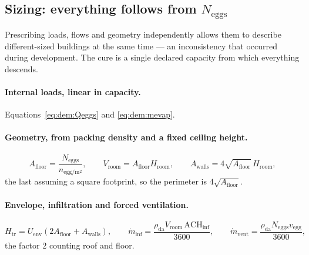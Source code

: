 \documentclass[11pt]{article}
\newcommand{\mdv}{\ensuremath{\dot m_{\mathrm{vent}}}}
\begin{document}
\subsection{Sizing: everything follows from \texorpdfstring{$N_{\mathrm{eggs}}$}{N\_eggs}}
\label{sec:dem:sizing}

Prescribing loads, flows and geometry independently allows them to describe
different-sized buildings at the same time --- an inconsistency that occurred
during development. The cure is a single declared capacity from which everything
descends.

\paragraph{Internal loads, linear in capacity.}
Equations~\eqref{eq:dem:Qeggs} and \eqref{eq:dem:mevap}.

\paragraph{Geometry, from packing density and a fixed ceiling height.}
\begin{equation}
A_{\mathrm{floor}}=\frac{N_{\mathrm{eggs}}}{n_{\mathrm{egg/m^2}}},\qquad
V_{\mathrm{room}}=A_{\mathrm{floor}}H_{\mathrm{room}},\qquad
A_{\mathrm{walls}}=4\sqrt{A_{\mathrm{floor}}}\,H_{\mathrm{room}},
\label{eq:dem:geom}
\end{equation}
the last assuming a square footprint, so the perimeter is
$4\sqrt{A_{\mathrm{floor}}}$.

\paragraph{Envelope, infiltration and forced ventilation.}
\begin{equation}
H_{\mathrm{tr}}=U_{\mathrm{env}}\left(2A_{\mathrm{floor}}+A_{\mathrm{walls}}\right),
\qquad
\dot m_{\mathrm{inf}}=\frac{\rho_{\mathrm{da}}V_{\mathrm{room}}\,\mathrm{ACH}_{\mathrm{inf}}}{3600},
\qquad
\mdv=\frac{\rho_{\mathrm{da}}N_{\mathrm{eggs}}v_{\mathrm{egg}}}{3600},
\label{eq:dem:Htr}
\end{equation}
the factor $2$ counting roof and floor.
\end{document}
